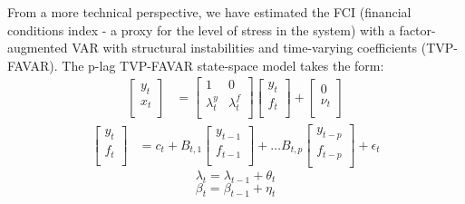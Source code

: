 \documentclass[12pt,a4paper]{article}
\begin{document}
From a more technical perspective, we have estimated the FCI (financial conditions index - a proxy for the level of stress in the system) with a factor-augmented VAR with structural instabilities and time-varying coefficients (TVP-FAVAR). The p-lag TVP-FAVAR \citep{koop_2013} state-space model takes the form:
\begin{align}
    \label{eq:tvpfavar_design}
    \begin{bmatrix}
        y_t \\
        x_t \\
    \end{bmatrix} &= 
    \begin{bmatrix}
        1 & 0 \\
        \lambda_t^y & \lambda_t^f \\
    \end{bmatrix}
    \begin{bmatrix}
        y_t \\
        f_t \\
    \end{bmatrix} +
    \begin{bmatrix}
        0 \\
        \nu_t \\
    \end{bmatrix}
\end{align}
\begin{align}
    \label{eq:tvpfavar_transition}
    \begin{bmatrix}
        y_t \\
        f_t \\
    \end{bmatrix} &=
    c_t +
    B_{t,1}
    \begin{bmatrix}
        y_{t-1} \\
        f_{t-1} \\
    \end{bmatrix} + \dots
    B_{t,p}
    \begin{bmatrix}
        y_{t-p} \\
        f_{t-p} \\
    \end{bmatrix} + \epsilon_t
\end{align}
\begin{equation}
    \label{eq:tvpfavar_design_coeff}
    \lambda_t = \lambda_{t-1} + \theta_t
\end{equation}
\begin{equation}
    \label{eq:tvpfavar_transition_coeff}
    \beta_t = \beta_{t-1} + \eta_t
\end{equation}
\end{document}
